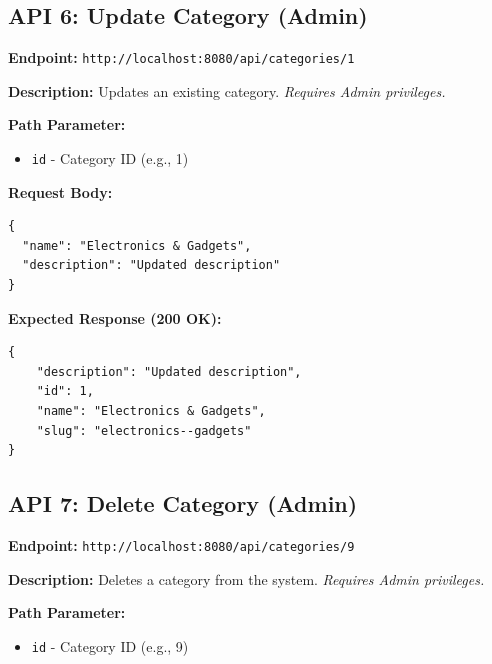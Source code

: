 \documentclass[12pt, a4paper]{article}
\begin{document}
\vspace{0.5cm}

\subsection{API 6: Update Category (Admin)}

\begin{tcolorbox}[colback=putcolor!10, colframe=putcolor, title=PUT]
\textbf{Endpoint:} \texttt{http://localhost:8080/api/categories/1}
\end{tcolorbox}

\textbf{Description:} Updates an existing category. \textit{Requires Admin privileges.}

\textbf{Path Parameter:}
\begin{itemize}
    \item \texttt{id} - Category ID (e.g., 1)
\end{itemize}

\textbf{Request Body:}
\begin{lstlisting}
{
  "name": "Electronics & Gadgets",
  "description": "Updated description"
}
\end{lstlisting}

\textbf{Expected Response (200 OK):}
\begin{lstlisting}
{
    "description": "Updated description",
    "id": 1,
    "name": "Electronics & Gadgets",
    "slug": "electronics--gadgets"
}
\end{lstlisting}

\vspace{0.5cm}

\subsection{API 7: Delete Category (Admin)}

\begin{tcolorbox}[colback=deletecolor!10, colframe=deletecolor, title=DELETE]
\textbf{Endpoint:} \texttt{http://localhost:8080/api/categories/9}
\end{tcolorbox}

\textbf{Description:} Deletes a category from the system. \textit{Requires Admin privileges.}

\textbf{Path Parameter:}
\begin{itemize}
    \item \texttt{id} - Category ID (e.g., 9)
\end{itemize}
\end{document}
